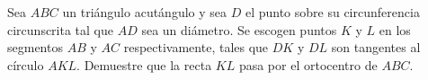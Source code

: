 Sea $ABC$ un triángulo acutángulo y sea $D$ el punto sobre su circunferencia circunscrita tal que $AD$ sea un diámetro. Se escogen puntos $K$ y $L$ en los segmentos $AB$ y $AC$ respectivamente, tales que $DK$ y $DL$ son tangentes al círculo $AKL$. Demuestre que la recta $KL$ pasa por el ortocentro de $ABC$.